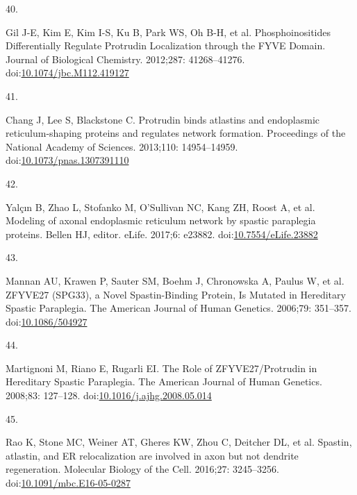 \documentclass[
  12pt,
  a4paper,
]{book}
\newlength{\cslhangindent}
\newlength{\csllabelwidth}
\newlength{\cslentryspacingunit} %
\newenvironment{CSLReferences}[2] %
 {%
  \setlength{\parindent}{0pt}
  \ifodd #1
  \let\oldpar\par
  \def\par{\hangindent=\cslhangindent\oldpar}
  \fi
  \setlength{\parskip}{#2\cslentryspacingunit}
 }%
 {}
\newcommand{\CSLLeftMargin}[1]{\parbox[t]{\csllabelwidth}{#1}}
\newcommand{\CSLRightInline}[1]{\parbox[t]{\linewidth - \csllabelwidth}{#1}\break}
\begin{document}
\begin{CSLReferences}{0}{0}
\leavevmode{}%
\CSLLeftMargin{40. }%
\CSLRightInline{Gil J-E, Kim E, Kim I-S, Ku B, Park WS, Oh B-H, et al. Phosphoinositides {Differentially Regulate Protrudin Localization} through the {FYVE Domain}. Journal of Biological Chemistry. 2012;287: 41268--41276. doi:\href{https://doi.org/10.1074/jbc.M112.419127}{10.1074/jbc.M112.419127}}

\leavevmode{}%
\CSLLeftMargin{41. }%
\CSLRightInline{Chang J, Lee S, Blackstone C. Protrudin binds atlastins and endoplasmic reticulum-shaping proteins and regulates network formation. Proceedings of the National Academy of Sciences. 2013;110: 14954--14959. doi:\href{https://doi.org/10.1073/pnas.1307391110}{10.1073/pnas.1307391110}}

\leavevmode{}%
\CSLLeftMargin{42. }%
\CSLRightInline{Yalçın B, Zhao L, Stofanko M, O'Sullivan NC, Kang ZH, Roost A, et al. Modeling of axonal endoplasmic reticulum network by spastic paraplegia proteins. Bellen HJ, editor. eLife. 2017;6: e23882. doi:\href{https://doi.org/10.7554/eLife.23882}{10.7554/eLife.23882}}

\leavevmode{}%
\CSLLeftMargin{43. }%
\CSLRightInline{Mannan AU, Krawen P, Sauter SM, Boehm J, Chronowska A, Paulus W, et al. {ZFYVE27} ({SPG33}), a {Novel Spastin-Binding Protein}, {Is Mutated} in {Hereditary Spastic Paraplegia}. The American Journal of Human Genetics. 2006;79: 351--357. doi:\href{https://doi.org/10.1086/504927}{10.1086/504927}}

\leavevmode{}%
\CSLLeftMargin{44. }%
\CSLRightInline{Martignoni M, Riano E, Rugarli EI. The {Role} of {ZFYVE27}/{Protrudin} in {Hereditary Spastic Paraplegia}. The American Journal of Human Genetics. 2008;83: 127--128. doi:\href{https://doi.org/10.1016/j.ajhg.2008.05.014}{10.1016/j.ajhg.2008.05.014}}

\leavevmode{}%
\CSLLeftMargin{45. }%
\CSLRightInline{Rao K, Stone MC, Weiner AT, Gheres KW, Zhou C, Deitcher DL, et al. Spastin, atlastin, and {ER} relocalization are involved in axon but not dendrite regeneration. Molecular Biology of the Cell. 2016;27: 3245--3256. doi:\href{https://doi.org/10.1091/mbc.E16-05-0287}{10.1091/mbc.E16-05-0287}}


\end{CSLReferences}
\end{document}
